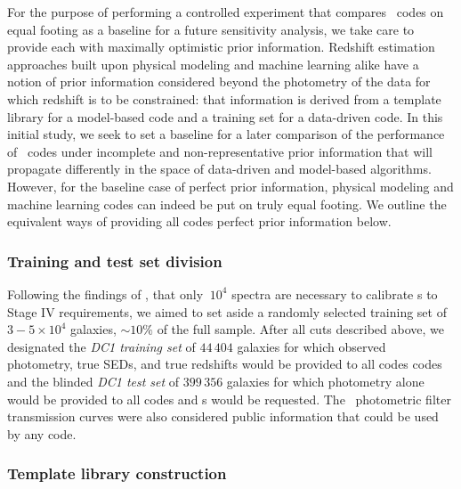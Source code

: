 For the purpose of performing a controlled experiment that compares \pzpdf\ codes on equal footing as a baseline for a future sensitivity analysis, we take care to provide each with maximally optimistic prior information.
Redshift estimation approaches built upon physical modeling and machine learning alike have a notion of prior information considered beyond the photometry of the data for which redshift is to be constrained: that information is derived from a template library for a model-based code and a training set for a data-driven code.
In this initial study, we seek to set a baseline for a later comparison of the performance of \pzpdf\ codes under incomplete and non-representative prior information that will propagate differently in the space of data-driven and model-based algorithms.
However, for the baseline case of perfect prior information, physical modeling and machine learning codes can indeed be put on truly equal footing.
We outline the equivalent ways of providing all codes perfect prior information below.

\subsubsection{Training and test set division}

Following the findings of \citet{Bernstein:10}, \citet{Masters:2017} that only $~10^{4}$ spectra are necessary to calibrate \pz s to Stage IV requirements, we aimed to set aside a randomly selected training set of $3-5\times 10^{4}$ galaxies, $\sim 10\%$ of the full sample.
After all cuts described above, we designated the \textit{DC1 training set} of $44\,404$ galaxies for which observed photometry, true SEDs, and true redshifts would be provided to all codes codes and the blinded \textit{DC1 test set} of $399\,356$ galaxies for which photometry alone would be provided to all codes and \pzpdf s would be requested.
The \lsst\ photometric filter transmission curves were also considered public information that could be used by any code.

\subsubsection{Template library construction}


